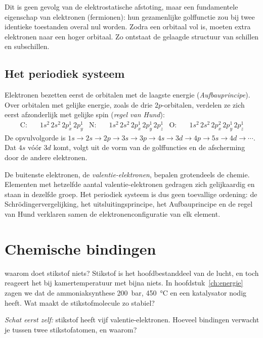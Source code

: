 Dit is geen gevolg van de elektrostatische afstoting, maar een fundamentele eigenschap van elektronen (fermionen): hun gezamenlijke golffunctie zou bij twee identieke toestanden overal nul worden. Zodra een orbitaal vol is, moeten extra elektronen naar een hoger orbitaal. Zo ontstaat de gelaagde structuur van schillen en subschillen.

\subsection{Het periodiek systeem}

Elektronen bezetten eerst de orbitalen met de laagste energie (\emph{Aufbauprincipe}). Over orbitalen met gelijke energie, zoals de drie $2p$-orbitalen, verdelen ze zich eerst afzonderlijk met gelijke spin (\emph{regel van Hund}):
\begin{align*}
\text{C:}  &\quad 1s^2\,2s^2\,2p^1_x\, 2p^1_y &
\text{N:}  &\quad 1s^2\,2s^2\,2p^1_x\,2p^1_y\,2p^1_z &
\text{O:}  &\quad 1s^2\,2s^2\,2p^2_x\,2p^1_y\,2p^1_z
\end{align*}
De opvulvolgorde is $1s \to 2s \to 2p \to 3s \to 3p \to 4s \to 3d \to 4p \to 5s \to 4d \to \cdots$. Dat $4s$ vóór $3d$ komt, volgt uit de vorm van de golffuncties en de afscherming door de andere elektronen.

De buitenste elektronen, de \emph{valentie-elektronen}, bepalen grotendeels de chemie. Elementen met hetzelfde aantal valentie-elektronen gedragen zich gelijkaardig en staan in dezelfde groep. Het periodiek systeem is dus geen toevallige ordening: de Schr\"odingervergelijking, het uitsluitingsprincipe, het Aufbauprincipe en de regel van Hund verklaren samen de elektronenconfiguratie van elk element.

\section{Chemische bindingen}

\begin{casus}{waarom doet stikstof niets?}
Stikstof is het hoofdbestanddeel van de lucht, en toch reageert het bij kamertemperatuur met bijna niets. In hoofdstuk~\ref{ch:energie} zagen we dat de ammoniaksynthese \SI{200}{\bar}, \SI{450}{\celsius} en een katalysator nodig heeft. Wat maakt de stikstofmolecule zo stabiel?

\emph{Schat eerst zelf:} stikstof heeft vijf valentie-elektronen. Hoeveel bindingen verwacht je tussen twee stikstofatomen, en waarom?
\end{casus}

